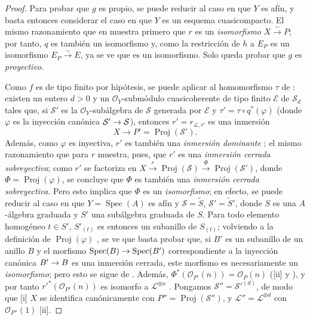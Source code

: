\documentclass[oneside,10pt]{amsart}
\makeatletter
\newcommand{\ega@arrow}[2]{\mathchoice{#1}{#2}{#2}{#2}}
\renewcommand{\to}{\ega@arrow{\longrightarrow}{\rightarrow}}
\newcommand{\oldpage}[2][]{\marginnote{\normalfont\footnotesize\textbf{#1}~|~#2}\ignorespaces}
\makeatother
\begin{document}
\begin{proof}
Para probar que $g$ es propio, se puede reducir al caso en que $Y$ es afín, y basta entonces considerar el caso en que $Y$ es un esquema cuasicompacto.
El mismo razonamiento que en  muestra primero que $r$ es un \emph{isomorfismo} $X\xrightarrow{\sim}P$;
por tanto, $q$ es también un isomorfismo y, como la restricción de $h$ a $E_P$ es un isomorfismo $E_P\xrightarrow{\sim}E$, ya se ve que  es un isomorfismo.
Solo queda probar que $g$ es \emph{proyectivo}.

Como $f$ es de tipo finito por hipótesis, se puede aplicar  al homomorfismo
\oldpage[II]{180}
$\tau$ de :
existen un entero $d>0$ y un $\mathcal{O}_Y$-submódulo cuasicoherente de tipo finito $\mathcal{E}$ de $\mathcal{S}_d$ tales que, si $\mathcal{S}'$ es la $\mathcal{O}_Y$-subálgebra de $\mathcal{S}$ generada por $\mathcal{E}$ y $\tau'=\tau\circ q^*(\varphi)$ (donde $\varphi$ es la inyección canónica $\mathcal{S}'\to\mathcal{S}$), entonces $r'=r_{\mathcal{L},\tau'}$ es una inmersión
\[
  X\longrightarrow P'=\operatorname{Proj}(\mathcal{S}').
\]
Además, como $\varphi$ es inyectiva, $r'$ es también una \emph{inmersión dominante} ;
el mismo razonamiento que para $r$ muestra, pues, que $r'$ es una \emph{inmersión cerrada sobreyectiva};
como $r'$ se factoriza en $X\xrightarrow{r}\operatorname{Proj}(\mathcal{S})
\xrightarrow{\Phi}\operatorname{Proj}(\mathcal{S}')$, donde $\Phi=\operatorname{Proj}(\varphi)$, se concluye que $\Phi$ es también una \emph{inmersión cerrada sobreyectiva}.
Pero esto implica que $\Phi$ es un \emph{isomorfismo};
en efecto, se puede reducir al caso en que $Y=\operatorname{Spec}(A)$ es afín y $\mathcal{S}=\widetilde{S}$, $\mathcal{S}'=\widetilde{S}'$, donde $S$ es una $A$-álgebra graduada y $S'$ una subálgebra graduada de $S$.
Para todo elemento homogéneo $t\in S'$, $S'_{(t)}$ es entonces un subanillo de $S_{(t)}$;
volviendo a la definición de $\operatorname{Proj}(\varphi)$ , se ve que basta probar que, si $B'$ es un subanillo de un anillo $B$ y el morfismo $\operatorname{Spec}(B)\to\operatorname{Spec}(B')$ correspondiente a la inyección canónica $B'\to B$ es una inmersión cerrada, este morfismo es necesariamente un \emph{isomorfismo};
pero esto se sigue de .
Además, $\Phi^*(\mathcal{O}_{P'}(n))=\mathcal{O}_P(n)$ ([ii] y ), y por tanto $r'^*(\mathcal{O}_{P'}(n))$ es isomorfo a $\mathcal{L}^{\otimes n}$ .
Pongamos $\mathcal{S}''=\mathcal{S}'^{(d)}$, de modo que [i] $X$ se identifica canónicamente con $P''=\operatorname{Proj}(\mathcal{S}'')$, y $\mathcal{L}''=\mathcal{L}^{\otimes d}$ con $\mathcal{O}_{P''}(1)$ [ii].


\end{proof}
\end{document}

